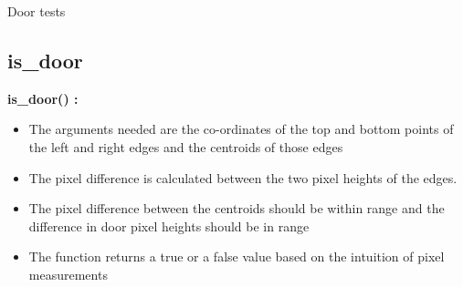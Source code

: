 \documentclass[10pt, a4paper]{beamer}
\begin{document}
\begin{frame}[allowframebreaks]{Door tests}
  \subsection{is\_door}
    \textbf{is\_door() : }
      \begin{itemize}
       \item The arguments needed are the co-ordinates of the top and bottom points of the left and right edges and the centroids of those edges
       \item The pixel difference is calculated between the two pixel heights of the edges.
       \item The pixel difference between the centroids should be within range and the difference in door pixel heights should be in range
       \item The function returns a true or a false value based on the intuition of pixel measurements
      \end{itemize}
\end{frame}
\end{document}
